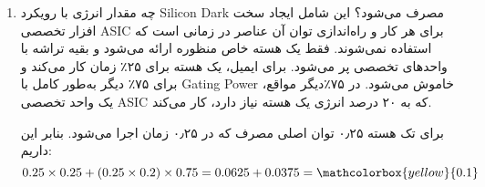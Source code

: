 \begin{enumerate}
	
	
	
	
	
	
	
	
	
	\item چه مقدار انرژی با رویکرد Silicon Dark مصرف می‌شود؟ این شامل ایجاد سخت افزار تخصصی ASIC برای هر کار و راه‌اندازی توان آن عناصر در زمانی است که استفاده نمی‌شوند. فقط یک هسته خاص منظوره ارائه می‌شود و بقیه تراشه با واحد‌های تخصصی پر می‌شود. برای ایمیل، یک هسته برای ۲۵٪
	 زمان کار می‌کند و برای ۷۵٪ دیگر به‌طور کامل با Gating Power خاموش می‌شود. در ۷۵٪دیگر مواقع، یک واحد تخصصی ASIC که به ۲۰ درصد انرژی یک هسته نیاز دارد، کار می‌کند.
	
	\begin{qsolve}
		برای تک هسته ۰٫۲۵ توان اصلی مصرف که در ۰٫۲۵ زمان اجرا می‌شود. بنابر این داریم: 
		\begin{equation}
			0.25 \times 0.25 + (0.25 \times 0.2) \times 0.75 = 0.0625 + 0.0375 = \mathcolorbox{yellow}{0.1}
		\end{equation}
	\end{qsolve}
\end{enumerate}